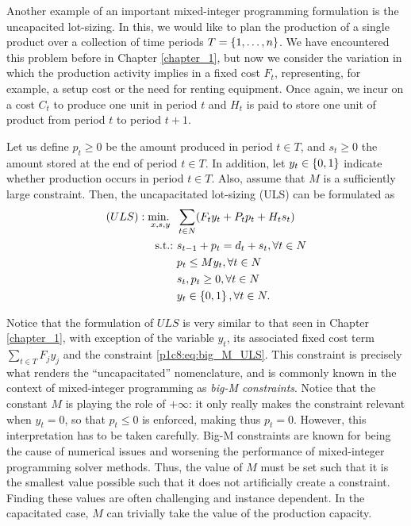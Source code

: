 Another example of an important mixed-integer programming formulation is the uncapacited lot-sizing. In this, we would like to plan the production of a single product over a collection of time periods $T = \left\{ 1, \dots, n \right \}$. We have encountered this problem before in Chapter \ref{chapter_1}, but now we consider the variation in which the production activity implies in a fixed cost $F_t$, representing, for example, a setup cost or the need for renting equipment. Once again, we incur on a cost $C_t$ to produce one unit in period $t$ and $H_t$ is paid to store one unit of product from period $t$ to period $t+1$.

Let us define $p_t \geq 0$ be the amount produced in period $t\in T$, and $s_t \geq 0$ the amount stored at the end of period $t \in T$. In addition, let $y_t \in \left\{ 0,1 \right \}$ indicate whether production occurs in period $t\in T$. Also, assume that $M$ is a sufficiently large constraint. Then, the uncapacitated lot-sizing (ULS) can be formulated as
%
\begin{align}
	(ULS) : \mathop{\text{min.~}}_{x,s,y} \ & \sum_{t \in N} (F_ty_t + P_tp_t + H_ts_t) \nonumber \\
	\mathop{\text{s.t.:~}} & s_{t-1} + p_t = d_t + s_t, \forall t \in N \nonumber \\
	& p_t \leq My_t, \forall t \in N  \label{p1c8:eq:big_M_ULS}\\
	&s_t, p_t \geq 0, \forall t \in N \nonumber \\
	&y_t \in \left\{ 0,1 \right \}, \forall t \in N. \nonumber
\end{align} 

Notice that the formulation of $ULS$ is very similar to that seen in Chapter \ref{chapter_1}, with exception of the variable $y_t$, its associated fixed cost term $\sum_{t \in T} F_jy_j$ and the constraint \eqref{p1c8:eq:big_M_ULS}. This constraint is precisely what renders the ``uncapacitated'' nomenclature, and is commonly known in the context of mixed-integer programming as \emph{big-M constraints}. Notice that the constant $M$ is playing the role of $+\infty$: it only really makes the constraint relevant when $y_t = 0$, so that $p_t \le 0$ is enforced, making thus $p_t = 0$. However, this interpretation has to be taken carefully. Big-M constraints are known for being the cause of numerical issues and worsening the performance of mixed-integer programming solver methods. Thus, the value of $M$ must be set such that it is the smallest value possible such that it does not artificially create a constraint. Finding these values are often challenging and instance dependent. In the capacitated case, $M$ can trivially take the value of the production capacity. 
 

